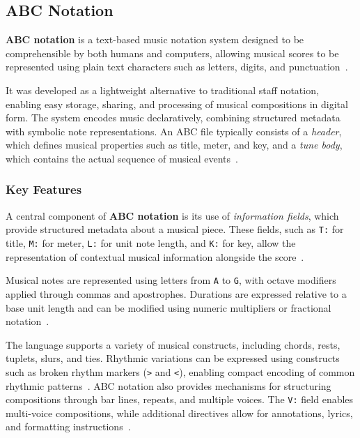 
\subsection{ABC Notation}\label{detail-subsec:abc-notation}

\textbf{ABC notation} is a text-based music notation system designed to be comprehensible by both humans and computers,
allowing musical scores to be represented using plain text characters such as letters, digits, and
punctuation~\cite{Walshaw_2011}.

It was developed as a lightweight alternative to traditional staff notation, enabling easy storage, sharing, and
processing of musical compositions in digital form.
The system encodes music declaratively, combining structured metadata with symbolic note representations.
An ABC file typically consists of a \textit{header}, which defines musical properties such as title, meter,
and key, and a \textit{tune body}, which contains the actual sequence of musical events~\cite{Walshaw_2011}.


\subsubsection{Key Features}

A central component of \textbf{ABC notation} is its use of \textit{information fields}, which provide structured
metadata about a musical piece.
These fields, such as \texttt{T:} for title, \texttt{M:} for meter, \texttt{L:} for unit note length, and \texttt{K:}
for key, allow the representation of contextual musical information alongside the score~\cite{Walshaw_2011}.

Musical notes are represented using letters from \texttt{A} to \texttt{G}, with octave modifiers applied through commas
and apostrophes.
Durations are expressed relative to a base unit length and can be modified using numeric multipliers or fractional
notation~\cite{Walshaw_2011}.

The language supports a variety of musical constructs, including chords, rests, tuplets, slurs, and ties.
Rhythmic variations can be expressed using constructs such as broken rhythm markers (\texttt{>} and \texttt{<}),
enabling compact encoding of common rhythmic patterns~\cite{Walshaw_2011}.
ABC notation also provides mechanisms for structuring compositions through bar lines, repeats, and multiple voices.
The \texttt{V:} field enables multi-voice compositions, while additional directives allow for annotations, lyrics, and
formatting instructions~\cite{Walshaw_2011}.

